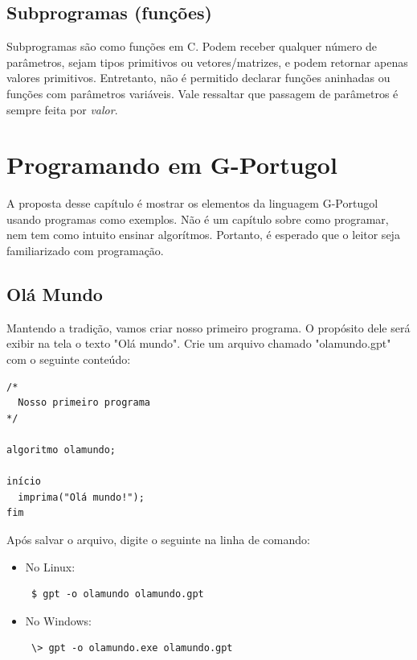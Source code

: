 \documentclass[a4paper,11pt]{report}
\begin{document}
\section{Subprogramas (funções)}

Subprogramas são como funções em C. Podem receber qualquer número de parâmetros,
sejam tipos primitivos ou vetores/matrizes, e podem retornar apenas valores
primitivos. Entretanto, não é permitido declarar funções aninhadas ou funções
com parâmetros variáveis. Vale ressaltar que passagem de parâmetros é sempre
feita por \textit{valor}.


\chapter{Programando em G-Portugol}

A proposta desse capítulo é mostrar os elementos da linguagem G-Portugol usando
programas como exemplos. Não é um capítulo sobre como programar, nem tem como
intuito ensinar algorítmos. Portanto, é esperado que o leitor seja familiarizado
com programação.

\section{Olá Mundo}

Mantendo a tradição, vamos criar nosso primeiro programa. O propósito dele será
exibir na tela o texto "Olá mundo". Crie um arquivo chamado "olamundo.gpt" com o
seguinte conteúdo:

\begin{program}
  \begin{verbatim}
/*
  Nosso primeiro programa
*/

algoritmo olamundo;

início
  imprima("Olá mundo!");
fim
  \end{verbatim}
  \caption{``Olá Mundo'' em G-Portugol.}
\end{program}

Após salvar o arquivo, digite o seguinte na linha de comando:

\begin{itemize}
  \item No Linux: \begin{verbatim} $ gpt -o olamundo olamundo.gpt \end{verbatim}
\item No Windows: \begin{verbatim} \> gpt -o olamundo.exe olamundo.gpt
  \end{verbatim}
\end{itemize}
\end{document}
